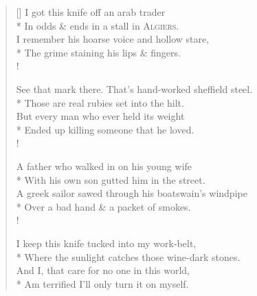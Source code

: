 \settowidth{\versewidth}{Where the sunlight catches those wine-dark stones.}
\begin{verse}[\versewidth]
I got this knife off an arab trader\\*
In odds \& ends in a stall in \textsc{Algiers}.\\
I remember his hoarse voice and hollow stare,\\*
The grime staining his lips \& fingers.\\!

See that mark there. That's hand-worked sheffield steel.\nobreak\\*
Those are real rubies set into the hilt.\\
But every man who ever held its weight\\*
Ended up killing someone that he loved.\\!

A father who walked in on his young wife\\*
With his own son gutted him in the street.\\
A greek sailor sawed through his boatswain's windpipe\\*
Over a bad hand \& a packet of smokes.\\!

I keep this knife tucked into my work-belt,\\*
Where the sunlight catches those wine-dark stones.\\
And I, that care for no one in this world,\\*
Am terrified I'll only turn it on myself.
\end{verse}
